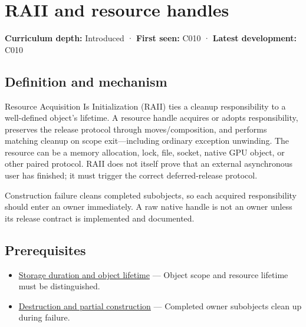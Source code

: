 \hypertarget{appendix-69739d3ab49b}{}\label{referencestart:appendix-69739d3ab49b}
\section{RAII and resource handles}\label{appendix-69739d3ab49b-raii-and-resource-handles}

\hypertarget{appendix-69739d3ab49b-raii-and-resource-handles}{}

\textbf{Curriculum depth:} Introduced · \textbf{First seen:} C010 · \textbf{Latest development:} C010

\begin{allmightroledefinition}

\subsection{Definition and mechanism}\label{appendix-69739d3ab49b-definition-and-mechanism}

\hypertarget{appendix-69739d3ab49b-definition-and-mechanism}{}

Resource Acquisition Is Initialization (RAII) ties a cleanup responsibility to a well-defined object's lifetime. A resource handle acquires or adopts responsibility, preserves the release protocol through moves/composition, and performs matching cleanup on scope exit---including ordinary exception unwinding. The resource can be a memory allocation, lock, file, socket, native GPU object, or other paired protocol. RAII does not itself prove that an external asynchronous user has finished; it must trigger the correct deferred-release protocol.

\end{allmightroledefinition}

Construction failure cleans completed subobjects, so each acquired responsibility should enter an owner immediately. A raw native handle is not an owner unless its release contract is implemented and documented.

\subsection{Prerequisites}\label{appendix-69739d3ab49b-prerequisites}

\hypertarget{appendix-69739d3ab49b-prerequisites}{}

\begin{itemize}
\tightlist
\item
  \hyperref[appendix-0b104bcba06b]{Storage duration and object lifetime} --- Object scope and resource lifetime must be distinguished.
\item
  \hyperref[appendix-9bfe377cef7a]{Destruction and partial construction} --- Completed owner subobjects clean up during failure.
\end{itemize}

